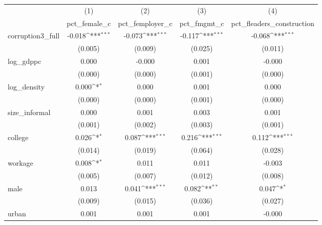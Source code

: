 {
\def\sym#1{\ifmmode^{#1}\else\(^{#1}\)\fi}
\begin{tabular}{l*{4}{c}}
\hline\hline
            &\multicolumn{1}{c}{(1)}&\multicolumn{1}{c}{(2)}&\multicolumn{1}{c}{(3)}&\multicolumn{1}{c}{(4)}\\
            &\multicolumn{1}{c}{pct\_female\_c}&\multicolumn{1}{c}{pct\_femployer\_c}&\multicolumn{1}{c}{pct\_fmgmt\_c}&\multicolumn{1}{c}{pct\_fleaders\_construction}\\
\hline
corruption3\_full&      -0.018\sym{***}&      -0.073\sym{***}&      -0.117\sym{***}&      -0.068\sym{***}\\
            &     (0.005)         &     (0.009)         &     (0.025)         &     (0.011)         \\
[1em]
log\_gdppc   &       0.000         &      -0.000         &       0.001         &      -0.000         \\
            &     (0.000)         &     (0.000)         &     (0.001)         &     (0.000)         \\
[1em]
log\_density &       0.000\sym{*}  &       0.000         &       0.001         &       0.000         \\
            &     (0.000)         &     (0.000)         &     (0.001)         &     (0.000)         \\
[1em]
size\_informal&       0.000         &       0.001         &       0.003         &       0.001         \\
            &     (0.001)         &     (0.002)         &     (0.003)         &     (0.001)         \\
[1em]
college     &       0.026\sym{*}  &       0.087\sym{***}&       0.216\sym{***}&       0.112\sym{***}\\
            &     (0.014)         &     (0.019)         &     (0.064)         &     (0.028)         \\
[1em]
workage     &       0.008\sym{*}  &       0.011         &       0.011         &      -0.003         \\
            &     (0.005)         &     (0.007)         &     (0.012)         &     (0.008)         \\
[1em]
male        &       0.013         &       0.041\sym{***}&       0.082\sym{**} &       0.047\sym{*}  \\
            &     (0.009)         &     (0.015)         &     (0.036)         &     (0.027)         \\
[1em]
urban       &       0.001         &       0.001         &       0.001         &      -0.000         \\

\end{tabular}}
